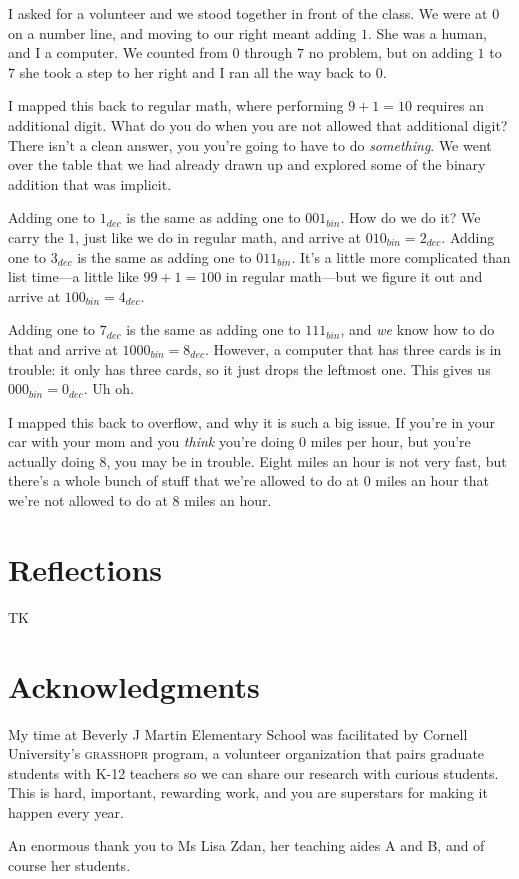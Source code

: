 \documentclass[sigplan]{acmart}
\makeatletter
\newcommand{\anshuman}[2][]{\todo[#1,backgroundcolor=blue!20]{A:\@ #2}}
\makeatother
\begin{document}
I asked for a volunteer and we stood together in front of the class.
We were at $0$ on a number line, and moving to our right meant adding $1$.
She was a human, and I a computer.
We counted from $0$ through $7$ no problem, but on adding $1$ to $7$ she took a step to her right and I ran all the way back to $0$.

I mapped this back to regular math, where performing $9 + 1 = 10$ requires an additional digit.
What do you do when you are not allowed that additional digit?
There isn't a clean answer, you you're going to have to do \emph{something}.
We went over the table that we had already drawn up and explored some of the binary addition that was implicit.

Adding one to $1_{dec}$ is the same as adding one to $001_{bin}$.
How do we do it? We carry the $1$, just like we do in regular math, and arrive at $010_{bin} = 2_{dec}$.
Adding one to $3_{dec}$ is the same as adding one to $011_{bin}$.
It's a little more complicated than list time---a little like $99+1 = 100$ in regular math---but we figure it out and arrive at $100_{bin} = 4_{dec}$.

Adding one to $7_{dec}$ is the same as adding one to $111_{bin}$, and \emph{we} know how to do that and arrive at $1000_{bin} = 8_{dec}$.
However, a computer that has three cards is in trouble: it only has three cards, so it just drops the leftmost one.
This gives us $000_{bin} = 0_{dec}$.
Uh oh.

I mapped this back to overflow, and why it is such a big issue.
If you're in your car with your mom and you \emph{think} you're doing $0$ miles per hour, but you're actually doing $8$, you may be in trouble.
Eight miles an hour is not very fast, but there's a whole bunch of stuff that we're allowed to do at $0$ miles an hour that we're not allowed to do at $8$ miles an hour.

\section*{Reflections}

TK

\section*{Acknowledgments}

My time at Beverly J Martin Elementary School was facilitated by Cornell University's \textsc{grasshopr} program, a volunteer organization that pairs graduate students with K-12 teachers so we can share our research with curious students.
This is hard, important, rewarding work, and you are superstars for making it happen every year.

An enormous thank you to Ms Lisa Zdan, her teaching aides A and B\anshuman{ask}, and of course her students.

\appendix



\end{document}
